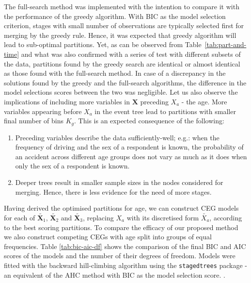 \documentclass[runningheads]{llncs}
\begin{document}
The full-search method was implemented with the intention to compare it with the performance of the greedy algorithm. With BIC as the model selection criterion, stages with small number of observations are typically selected first for merging by the greedy rule. Hence, it was expected that greedy algorithm will lead to sub-optimal partitions. Yet, as can be observed from Table~\ref{tab:part-and-time} and what was also confirmed with a series of test with different subsets of the data, partitions found by the greedy search are identical or almost identical as those found with the full-search method. In case of a discrepancy in the solutions found by the greedy and the full-search algorithms, the difference in the model selections scores between the two  was negligible.
Let us also observe the implications of including more variables in $\boldsymbol{X}$ preceding $X_a$ - the age. More variables appearing before $X_a$ in the event tree lead to partitions with smaller final number of bins $K_g$. This is an expected consequence of the following:
\begin{enumerate}[topsep=0pt]
    \item Preceding variables describe the data sufficiently-well; e.g.: when the frequency of driving and the sex of a respondent is known, the probability of an accident across different age groups does not vary as much as it does when only the sex of a respondent is known. 
    \item Deeper trees result in smaller sample sizes in the nodes considered for merging. Hence, there is less evidence for the need of more stages.    
\end{enumerate}
Having derived the optimised partitions for age, we can construct CEG models for each of $\tilde{\boldsymbol{X}_1}$, $\tilde{\boldsymbol{X}_2}$ and $\tilde{\boldsymbol{X}_3}$, replacing $X_a$ with its discretised form $\tilde{X_a}$, according to the best scoring partitions. To compare the efficacy of our proposed method we also construct competing CEGs with age split into groups of equal frequencies. Table \ref{tab:bic-aic-df} shows the comparison of the final BIC and AIC scores of the models and the number of their degrees of freedom. Models were fitted with the backward hill-climbing algorithm using the \texttt{stagedtrees} package - an equivalent of the AHC method with BIC as the model selection score. \cite{stagedtrees}.
\end{document}
